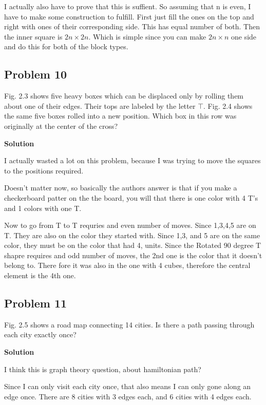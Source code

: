 \documentclass{article}
\begin{document}
I actually also have to prove that this is suffient. So assuming that n is even,
I have to make some construction to fulfill. First just fill the ones on the top and right with ones of their corresponding side. 
This has equal number of both. Then the inner square is $2n\times 2n$. Which is simple since you can make $2n\times n$ one side and do this for both 
of the block types.

\subsection{Problem 10}

Fig. 2.3 shows five heavy boxes which can be displaced only by rolling them about
one of their edges. Their tops are labeled by the letter $\top$. Fig. 2.4 shows the same
five boxes rolled into a new position. Which box in this row was originally at the
center of the cross?


\textbf{Solution}

I actually wasted a lot on this problem, because I was trying to move the squares 
to the positions required.

Doesn't matter now, so basically the authors answer is that if you make a checkerboard 
patter on the the board, you will that there is one color with 4 T's and 1 colors 
with one T.

Now to go from T to T requries and even number of moves. Since 1,3,4,5 are on T.
They are also on the color they started with. Since 1,3, and 5 are on the same color,
they must be on the color that had 4, units. Since the Rotated 90 degree T shapre
requires and odd number of moves, the 2nd one is the color that it doesn't belong to.
There fore it was also in the one with 4 cubes, therefore the central element is the 4th one.

\subsection{Problem 11}

Fig. 2.5 shows a road map connecting 14 cities. Is there a path passing through each
city exactly once?

\textbf{Solution}

I think this is graph theory question, about hamiltonian path?

Since I can only visit each city once, that also means I can only gone along 
an edge once. There are 8 cities with 3 edges each, and 6 cities with 4 edges each.
\end{document}
